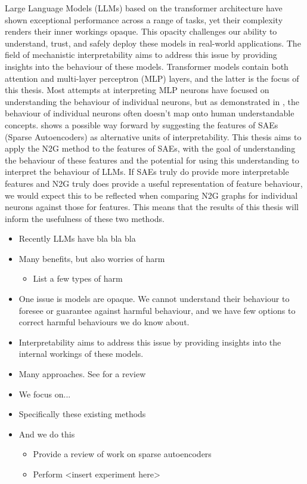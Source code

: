 \documentclass[../main.tex]{subfiles}
\begin{document}
Large Language Models (LLMs) based on the transformer architecture \citep{vaswani_attention_2023} have shown exceptional performance across a range of tasks, yet their complexity renders their inner workings opaque.
This opacity challenges our ability to understand, trust, and safely deploy these models in real-world applications.
The field of mechanistic interpretability aims to address this issue by providing insights into the behaviour of these models.
Transformer models contain both attention and multi-layer perceptron (MLP) layers, and the latter is the focus of this thesis.
Most attempts at interpreting MLP neurons have focused on understanding the behaviour of individual neurons, but as demonstrated in \citet{elhage_toy_2022}, the behaviour of individual neurons often doesn't map onto human understandable concepts.
\citet{bricken_towards_2023} shows a possible way forward by suggesting the features of SAEs (Sparse Autoencoders) as alternative units of interpretability.
This thesis aims to apply the N2G \citep{foote_neuron_2023} method to the features of SAEs, with the goal of understanding the behaviour of these features and the potential for using this understanding to interpret the behaviour of LLMs.
If SAEs truly do provide more interpretable features and N2G truly does provide a useful representation of feature behaviour, we would expect this to be reflected when comparing N2G graphs for individual neurons against those for features. 
This means that the results of this thesis will inform the usefulness of these two methods.

\begin{itemize}
    \item Recently LLMs have bla bla bla
    \item Many benefits, but also worries of harm
    \begin{itemize}
        \item List a few types of harm
    \end{itemize}
    \item One issue is models are opaque. We cannot understand their behaviour to foresee or guarantee against harmful behaviour, and we have few options to correct harmful behaviours we do know about.
    \item Interpretability aims to address this issue by providing insights into the internal workings of these models.
    \item Many approaches. See \citet{bereska_mechanistic_2024} for a review
    \item We focus on...
    \item Specifically these existing methods
    \item And we do this
    \begin{itemize}
        \item Provide a review of work on sparse autoencoders
        \item Perform <insert experiment here>
    \end{itemize}
\end{itemize}

\end{document}
